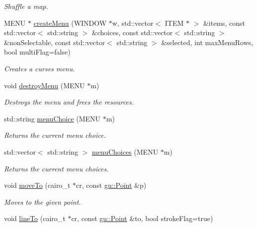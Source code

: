 \begin{DoxyCompactItemize}
\begin{DoxyCompactList}\small\item\em Shuffle a map. \end{DoxyCompactList}\item 
M\+E\+NU $\ast$ \hyperlink{namespaceslb_1_1core_1_1util_a9ecb2bc008a69c458151515197ce018c}{create\+Menu} (W\+I\+N\+D\+OW $\ast$w, std\+::vector$<$ I\+T\+EM $\ast$ $>$ \&items, const std\+::vector$<$ std\+::string $>$ \&choices, const std\+::vector$<$ std\+::string $>$ \&non\+Selectable, const std\+::vector$<$ std\+::string $>$ \&selected, int max\+Menu\+Rows, bool multi\+Flag=false)
\begin{DoxyCompactList}\small\item\em Creates a {\ttfamily curses} menu. \end{DoxyCompactList}\item 
void \hyperlink{namespaceslb_1_1core_1_1util_a1ba19280252473582d7a52ff677107be}{destroy\+Menu} (M\+E\+NU $\ast$m)
\begin{DoxyCompactList}\small\item\em Destroys the menu and frees the resources. \end{DoxyCompactList}\item 
std\+::string \hyperlink{namespaceslb_1_1core_1_1util_a5f6196dcf481c926229079d9b4153cbc}{menu\+Choice} (M\+E\+NU $\ast$m)
\begin{DoxyCompactList}\small\item\em Returns the current menu choice. \end{DoxyCompactList}\item 
std\+::vector$<$ std\+::string $>$ \hyperlink{namespaceslb_1_1core_1_1util_a46276e10206643d3cee0d5c2c0eeb5ac}{menu\+Choices} (M\+E\+NU $\ast$m)
\begin{DoxyCompactList}\small\item\em Returns the current menu choices. \end{DoxyCompactList}\item 
void \hyperlink{namespaceslb_1_1core_1_1util_a8d1707b9caf4ff4b66d90c512974bd19}{move\+To} (cairo\+\_\+t $\ast$cr, const \hyperlink{structslb_1_1core_1_1util_1_1gu_1_1Point}{gu\+::\+Point} \&p)
\begin{DoxyCompactList}\small\item\em Moves to the given point. \end{DoxyCompactList}\item 
void \hyperlink{namespaceslb_1_1core_1_1util_a5ceb479b918ab45219b1b509183a57cc}{line\+To} (cairo\+\_\+t $\ast$cr, const \hyperlink{structslb_1_1core_1_1util_1_1gu_1_1Point}{gu\+::\+Point} \&to, bool stroke\+Flag=true)

\end{DoxyCompactItemize}
